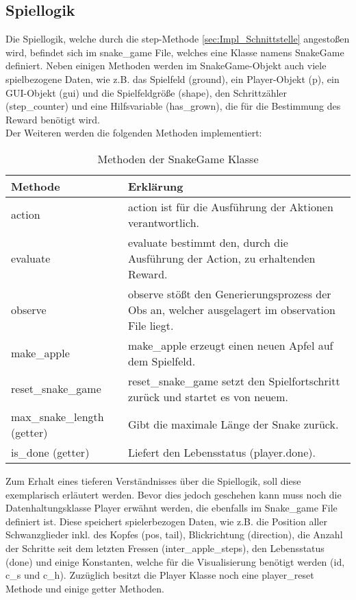 \subsection{Spiellogik} \label{sec:Impl_Spiellogik}
Die Spiellogik, welche durch die step-Methode \ref{sec:Impl_Schnittstelle} angestoßen wird, befindet sich im snake\_game File, welches eine Klasse namens SnakeGame definiert. Neben einigen Methoden werden im SnakeGame-Objekt auch viele spielbezogene Daten, wie z.B. das Spielfeld (ground), ein Player-Objekt (p),
ein GUI-Objekt (gui) und die Spielfeldgröße (shape), den Schrittzähler (step\_counter) und eine Hilfsvariable (has\_grown), die für die Bestimmung des Reward benötigt wird.\\
Der Weiteren werden die folgenden Methoden implementiert:
\begin{longtable}[h]{|p{4cm}|p{\linewidth - 5cm}|}
	\caption{Methoden der SnakeGame Klasse}
	\label{tab:methods_of_SnakeGame} 
	\endfirsthead
	\endhead
	\hline
	Methode & Erklärung \\
	\hline
	action & action ist für die Ausführung der Aktionen verantwortlich.\\
	\hline
	evaluate & evaluate bestimmt den, durch die Ausführung der Action, zu erhaltenden Reward.\\
	\hline
	observe & observe stößt den Generierungsprozess der Obs an, welcher ausgelagert im observation File liegt. \\
	\hline
	make\_apple & make\_apple erzeugt einen neuen Apfel auf dem Spielfeld. \\
	\hline
	reset\_snake\_game & reset\_snake\_game setzt den Spielfortschritt zurück und startet es von neuem. \\
	\hline
	max\_snake\_length (getter) & Gibt die maximale Länge der Snake zurück. \\
	\hline
	is\_done (getter) & Liefert den Lebensstatus (player.done). \\
	\hline
\end{longtable}

Zum Erhalt eines tieferen Verständnisses über die Spiellogik, soll diese exemplarisch erläutert werden. Bevor dies jedoch geschehen kann muss noch die Datenhaltungsklasse Player erwähnt werden, die ebenfalls im Snake\_game File definiert ist.
Diese speichert spielerbezogen Daten, wie z.B. die Position aller Schwanzglieder inkl. des Kopfes (pos, tail), Blickrichtung (direction), die Anzahl der Schritte seit dem letzten Fressen (inter\_apple\_steps), den Lebensstatus (done) und einige Konstanten, welche für die Visualisierung benötigt werden (id, c\_s und c\_h). Zuzüglich besitzt die Player Klasse noch eine player\_reset Methode und einige getter Methoden.\\

